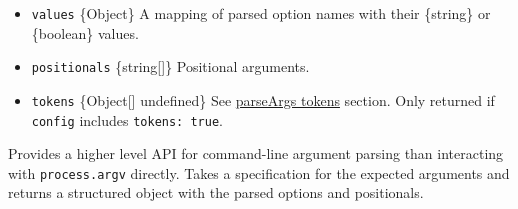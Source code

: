 \begin{itemize}
  \begin{itemize}
  \tightlist
  \item
    \texttt{values} \{Object\} A mapping of parsed option names with
    their \{string\} or \{boolean\} values.
  \item
    \texttt{positionals} \{string{[}{]}\} Positional arguments.
  \item
    \texttt{tokens} \{Object{[}{]} \textbar{} undefined\} See
    \hyperref[parseargs-tokens]{parseArgs tokens} section. Only returned
    if \texttt{config} includes \texttt{tokens:\ true}.
  \end{itemize}
\end{itemize}

Provides a higher level API for command-line argument parsing than
interacting with \texttt{process.argv} directly. Takes a specification
for the expected arguments and returns a structured object with the
parsed options and positionals.

\begin{Shaded}
\begin{Highlighting}[]
 \OperatorTok{;}
\OperatorTok{=}\NormalTok{ [}\OperatorTok{,} \OperatorTok{,} \NormalTok{]}\OperatorTok{;}
\OperatorTok{=}\NormalTok{ \{}
  \OperatorTok{:}\NormalTok{ \{}
    \OperatorTok{:} \OperatorTok{,}
    \OperatorTok{:} \OperatorTok{,}
\NormalTok{  \}}\OperatorTok{,}
  \OperatorTok{:}\NormalTok{ \{}
    \OperatorTok{:} \OperatorTok{,}
\NormalTok{  \}}\OperatorTok{,}
\NormalTok{\}}\OperatorTok{;}
\NormalTok{ \{}
\OperatorTok{,}
\OperatorTok{,}
\NormalTok{\} }\OperatorTok{=} \OperatorTok{,}\OperatorTok{;}
\OperatorTok{,}\OperatorTok{;}
\end{Highlighting}
\end{Shaded}

